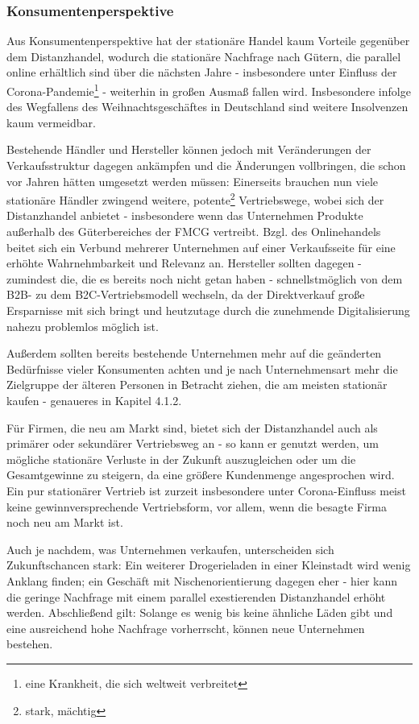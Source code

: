 \subsubsection{Konsumentenperspektive}
Aus Konsumentenperspektive hat der stationäre Handel kaum Vorteile gegenüber dem Distanzhandel, wodurch die stationäre Nachfrage nach Gütern, die parallel online erhältlich sind über die nächsten Jahre - insbesondere unter Einfluss der Corona-Pandemie\footnote{eine Krankheit, die sich weltweit verbreitet} - weiterhin in großen Ausmaß fallen wird. Insbesondere infolge des Wegfallens des Weihnachtsgeschäftes in Deutschland sind weitere Insolvenzen kaum vermeidbar.

Bestehende Händler und Hersteller können jedoch mit Veränderungen der Verkaufsstruktur dagegen ankämpfen und die Änderungen vollbringen, die schon vor Jahren hätten umgesetzt werden müssen: Einerseits brauchen nun viele stationäre Händler zwingend weitere, potente\footnote{stark, mächtig} Vertriebswege, wobei sich der Distanzhandel anbietet - insbesondere wenn das Unternehmen Produkte außerhalb des Güterbereiches der \ac{FMCG} vertreibt. Bzgl. des Onlinehandels beitet sich ein Verbund mehrerer Unternehmen auf einer Verkaufsseite für eine erhöhte Wahrnehmbarkeit und Relevanz an. Hersteller sollten dagegen - zumindest die, die es bereits noch nicht getan haben - schnellstmöglich von dem \ac{B2B}- zu dem \ac{B2C}-Vertriebsmodell wechseln, da der Direktverkauf große Ersparnisse mit sich bringt und heutzutage durch die zunehmende Digitalisierung nahezu problemlos möglich ist.

Außerdem sollten bereits bestehende Unternehmen mehr auf die geänderten Bedürfnisse vieler Konsumenten achten und je nach Unternehmensart mehr die Zielgruppe der älteren Personen in Betracht ziehen, die am meisten stationär kaufen - genaueres in Kapitel 4.1.2.

Für Firmen, die neu am Markt sind, bietet sich der Distanzhandel auch als primärer oder sekundärer Vertriebsweg an - so kann er genutzt werden, um mögliche stationäre Verluste in der Zukunft auszugleichen oder um die Gesamtgewinne zu steigern, da eine größere Kundenmenge angesprochen wird. Ein pur stationärer Vertrieb ist zurzeit insbesondere unter Corona-Einfluss meist keine gewinnversprechende Vertriebsform, vor allem, wenn die besagte Firma noch neu am Markt ist.

Auch je nachdem, was Unternehmen verkaufen, unterscheiden sich Zukunftschancen stark: Ein weiterer Drogerieladen in einer Kleinstadt wird wenig Anklang finden; ein Geschäft mit Nischenorientierung dagegen eher - hier kann die geringe Nachfrage mit einem parallel exestierenden Distanzhandel erhöht werden. %
Abschließend gilt: Solange es wenig bis keine ähnliche Läden gibt und eine ausreichend hohe Nachfrage vorherrscht, können neue Unternehmen bestehen.

